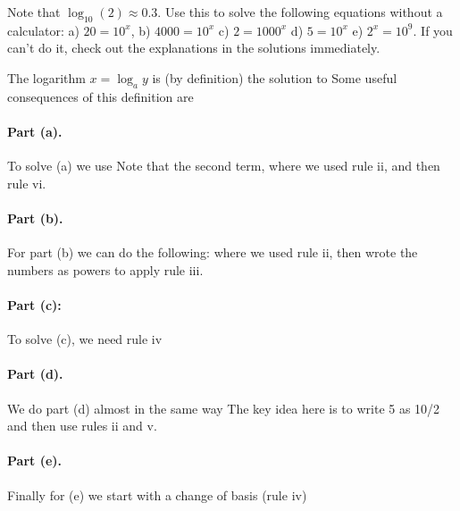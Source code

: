 
Note that $\log_{10}(2)\approx 0.3$. Use this to solve the following equations without a calculator: a) $20=10^x$, b) $4000=10^x$ c) $2=1000^x$ d) $5=10^x$ e) $2^x=10^9$. If you can't do it, check out the explanations in the solutions immediately.

\solution
The logarithm $x=\log_a{y}$ is (by definition) the solution to  Some useful consequences of this definition are 

\paragraph{Part (a).}To solve (a) we use
Note that the second term, where we used rule ii, and then rule vi.\\[0.5em] 
\paragraph{Part (b).}For part (b) we can do the following:
where we used rule ii, then wrote the numbers as powers to apply rule iii.\\[0.5em]
\paragraph{Part (c):} To solve (c), we need rule iv
\\[0.5em]
\paragraph{Part (d).} We do part (d) almost in the same way
The key idea here is to write 5 as 10/2 and then use rules ii and v.
\\[0.5em]
\paragraph{Part (e).} Finally for (e) we start with a change of basis (rule iv)

